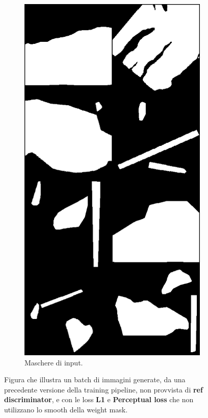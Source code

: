 \begin{figure}[htbp]
\begin{subfigure}[b]{0.3\textwidth}
        \label{fig:artifacts_example_2}
    \end{subfigure}
    \hfill
    \begin{subfigure}[b]{0.3\textwidth}
        \includegraphics[width=\textwidth]{imgs/Coigan/results/artifacts/media_images_union_shapes_60500_fef7b7fd942533d3c91b.png}
        \caption{Maschere di input.}
        \label{fig:artifacts_example_3}
    \end{subfigure}
    \caption{Figura che illustra un batch di immagini generate, da una precedente versione della training pipeline, non provvista di
    \textbf{ref discriminator}, e con le loss \textbf{L1} e \textbf{Perceptual loss} che non utilizzano lo smooth della weight mask.}
    \label{fig:artifacts_example}
\end{figure}
 

